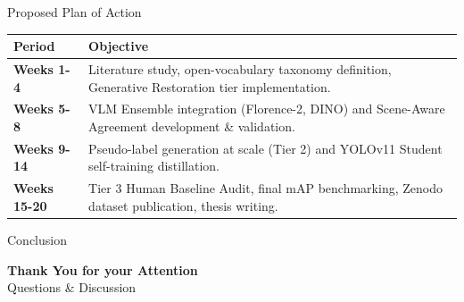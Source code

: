 \documentclass[aspectratio=169, 10pt]{beamer}
\begin{document}
\begin{frame}{Proposed Plan of Action}
    \begin{table}[]
        \centering
        \small
        \begin{tabular}{|p{2cm}|p{9cm}|}
        \hline
        \textbf{Period} & \textbf{Objective} \\ \hline
        \textbf{Weeks 1-4} & Literature study, open-vocabulary taxonomy definition, Generative Restoration tier implementation. \\ \hline
        \textbf{Weeks 5-8} & VLM Ensemble integration (Florence-2, DINO) and Scene-Aware Agreement development \& validation. \\ \hline
        \textbf{Weeks 9-14} & Pseudo-label generation at scale (Tier 2) and YOLOv11 Student self-training distillation. \\ \hline
        \textbf{Weeks 15-20} & Tier 3 Human Baseline Audit, final mAP benchmarking, Zenodo dataset publication, thesis writing. \\ \hline
        \end{tabular}
    \end{table}

    \vspace{0.3cm}

\end{frame}

\begin{frame}{Conclusion}
    \begin{center}
        \LARGE \textbf{Thank You for your Attention}\\
        \vspace{0.5cm}
        \large Questions \& Discussion
    \end{center}
\end{frame}
\end{document}
